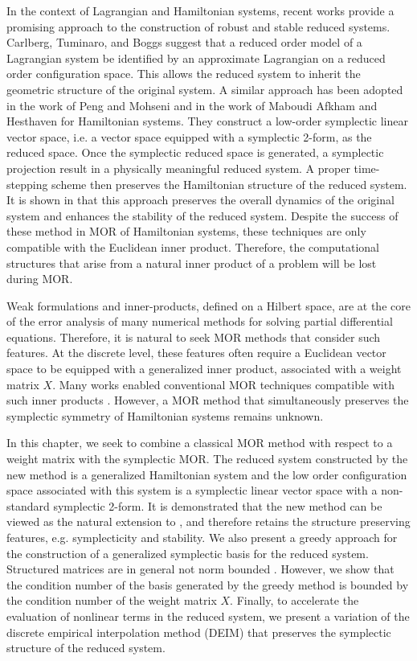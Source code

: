 In the context of Lagrangian and Hamiltonian systems, recent works provide a promising approach to the construction of robust and stable reduced systems. Carlberg, Tuminaro, and Boggs \cite{doi:10.1137/140959602} suggest that a reduced order model of a Lagrangian system be identified by an approximate Lagrangian on a reduced order configuration space. This allows the reduced system to inherit the geometric structure of the original system. A similar approach has been adopted in the work of Peng and Mohseni \cite{doi:10.1137/140978922} and in the work of Maboudi Afkham and Hesthaven \cite{doi:10.1137/17M1111991} for Hamiltonian systems. They construct a low-order symplectic linear vector space, i.e. a vector space equipped with a symplectic 2-form, as the reduced space. Once the symplectic reduced space is generated, a symplectic projection result in a physically meaningful reduced system. A proper time-stepping scheme then preserves the Hamiltonian structure of the reduced system. It is shown in \cite{doi:10.1137/17M1111991,doi:10.1137/140978922} that this approach preserves the overall dynamics of the original system and enhances the stability of the reduced system. Despite the success of these method in MOR of Hamiltonian systems, these techniques are only compatible with the Euclidean inner product. Therefore, the computational structures that arise from a natural inner product of a problem will be lost during MOR.

Weak formulations and inner-products, defined on a Hilbert space, are at the core of the error analysis of many numerical methods for solving partial differential equations. Therefore, it is natural to seek MOR methods that consider such features. At the discrete level, these features often require a Euclidean vector space to be equipped with a generalized inner product, associated with a weight matrix $X$. Many works enabled conventional MOR techniques compatible with such inner products \cite{sen2006natural}. However, a MOR method that simultaneously preserves the symplectic symmetry of Hamiltonian systems remains unknown. 

In this chapter, we seek to combine a classical MOR method with respect to a weight matrix with the symplectic MOR. The reduced system constructed by the new method is a generalized Hamiltonian system and the low order configuration space associated with this system is a symplectic linear vector space with a non-standard symplectic 2-form. It is demonstrated that the new method can be viewed as the natural extension to \cite{doi:10.1137/17M1111991}, and therefore retains the structure preserving features, e.g. symplecticity and stability. We also present a greedy approach for the construction of a generalized symplectic basis for the reduced system. Structured matrices are in general not norm bounded \cite{doi:10.1137/050628519}. However, we show that the condition number of the basis generated by the greedy method is bounded by the condition number of the weight matrix $X$. Finally, to accelerate the evaluation of nonlinear terms in the reduced system, we present a variation of the discrete empirical interpolation method (DEIM) that preserves the symplectic structure of the reduced system.

